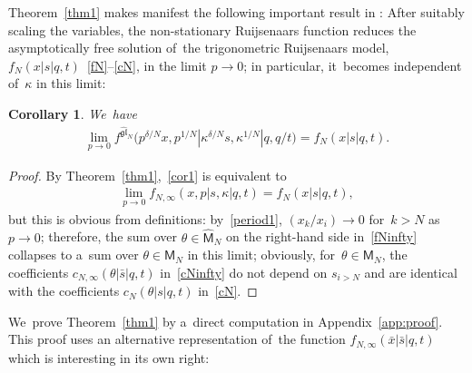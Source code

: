 \documentclass[pdftex]{sigma}%
\numberwithin{equation}{section}
\newtheorem{Corollary}[Theorem]{Corollary}
\newcommand{\bx}{\bar{x}}
\newcommand{\bs}{\bar{s}}
\begin{document}
Theorem~\ref{thm1} makes manifest the following important result in \cite{S}: After suitably scaling the variables, the non-stationary Ruijsenaars function reduces the asymptotically free solution of~the trigonometric Ruijsenaars model, $f_N(x|s|q,t)$~\eqref{fN}--\eqref{cN}, in the limit $p\to 0$; in particular, it~becomes independent of~$\kappa$ in this limit:

\begin{Corollary}
We~have
\begin{gather}
\label{cor1}
\lim_{p\to 0} f^{\widehat{\mathfrak{gl}}_N}\big(p^{\delta/N}x,p^{1/N}|\kappa^{\delta/N} s,\kappa^{1/N}|q,q/t\big) = f_{N}(x|s|q,t).
\end{gather}
\end{Corollary}
\begin{proof}
By Theorem~\ref{thm1},~\eqref{cor1} is equivalent to
\begin{gather*}
\lim_{p\to 0} f_{N,\infty}(x,p|s,\kappa|q,t) =f_N(x|s|q,t),
\end{gather*}
but this is obvious from definitions: by~\eqref{period1}, $(x_k/x_i)\to 0$ for~$k>N$ as $p\to 0$; therefore, the sum over $\theta\in\hat{\mathsf{M}}_N$ on the right-hand side in~\eqref{fNinfty} collapses to a~sum over $\theta\in \mathsf{M}_N$ in this limit; obviously, for~$\theta\in\mathsf{M}_N$, the coefficients $c_{N,\infty}(\theta|\bs|q,t)$ in~\eqref{cNinfty} do not depend on $s_{i>N}$ and are identical with the coefficients $c_N(\theta|s|q,t)$ in~\eqref{cN}.
\end{proof}

We~prove Theorem~\ref{thm1} by a~direct computation in Appendix~\ref{app:proof}. This proof uses an alternative representation of~the function $f_{N,\infty}(\bx|\bs|q,t)$ which is interesting in its own right:
\end{document}
